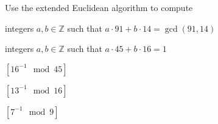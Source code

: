 \documentclass[a4paper,10pt,landscape,twocolumn]{scrartcl}
\begin{document}
\begin{exercise}  Use the extended Euclidean
  algorithm to compute
\begin{subex}
integers $a,b \in \mathbb{Z}$ such that $a \cdot 91 + b \cdot 14 = \gcd(91,14)$
\end{subex}
\begin{subex}
integers $a,b \in \mathbb{Z}$ such that $a \cdot 45 + b \cdot 16 = 1$
\end{subex}
\begin{subex}
$[16^{-1} \mod 45]$
\end{subex}
\begin{subex}
$[13^{-1} \mod 16]$
\end{subex}
\begin{subex}
$[7^{-1} \mod 9]$
\end{subex}
\end{exercise}
\end{document}
